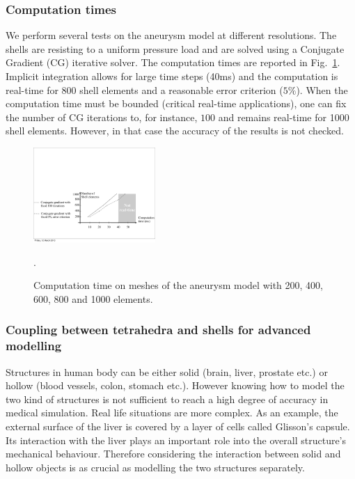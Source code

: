 \documentclass{llncs}
\begin{document}
\subsubsection{Computation times}
%
We perform several tests on the aneurysm model at different resolutions. 
The shells are resisting to a uniform pressure load and are solved using a Conjugate Gradient (CG) iterative solver.
The computation times are reported in Fig.~\ref{fig-computation}. 
Implicit integration allows for large time steps (40ms) and the computation is real-time for 800 shell elements and a reasonable error criterion ($5\%$).
When the computation time must be bounded (critical real-time applications), one can fix the number of CG iterations to, for instance, $100$ and remains real-time for 1000 shell elements. However, in that case the accuracy of the results is not checked.
%
\begin{figure}
\centering
\includegraphics[height=3.6cm]{images/computation_time.pdf}
\vspace{-0.2cm}
\caption {Computation time on meshes of the aneurysm model with 200, 400, 600, 800 and 1000 elements.}.
\vspace{-0.6cm}
\label{fig-computation}
\end{figure}
%
%
\subsubsection{Coupling between tetrahedra and shells for advanced modelling}
%
Structures in human body can be either solid (brain, liver, prostate etc.) or hollow (blood vessels, colon, stomach etc.). However knowing how to model the two kind of structures is not sufficient to reach a high degree of accuracy in medical simulation. Real life situations are more complex. As an example, the external surface of the liver is covered by a layer of cells called Glisson's capsule. Its interaction with the liver plays an important role into the overall structure's mechanical behaviour. Therefore considering the interaction between solid and hollow objects is as crucial as modelling the two structures separately. 
\end{document}

